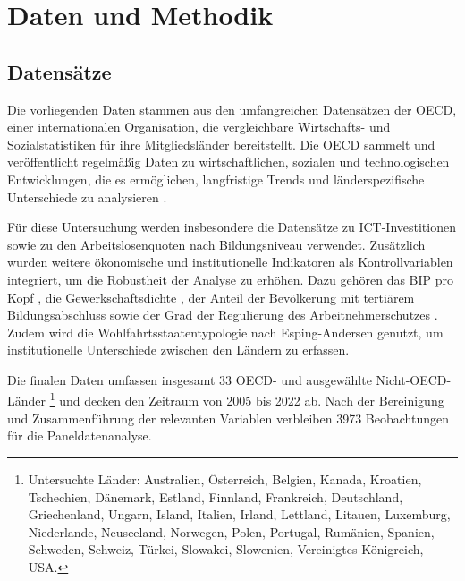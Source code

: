 

\section{Daten und Methodik}

\subsection{Datensätze}

Die vorliegenden Daten stammen aus den umfangreichen Datensätzen der \ac{OECD}, einer 
internationalen Organisation, die vergleichbare Wirtschafts- und Sozialstatistiken für ihre 
Mitgliedsländer bereitstellt. Die \ac{OECD} sammelt und veröffentlicht regelmäßig Daten zu 
wirtschaftlichen, sozialen und technologischen Entwicklungen, die es ermöglichen, langfristige 
Trends und länderspezifische Unterschiede zu analysieren \parencite{oecd2022ict}.

Für diese Untersuchung werden insbesondere die Datensätze zu \ac{ICT}-Investitionen 
\parencite{oecd2022ict} sowie zu den Arbeitslosenquoten nach Bildungsniveau 
\parencite{oecd2022unemployment} verwendet. Zusätzlich wurden weitere ökonomische und 
institutionelle Indikatoren als Kontrollvariablen integriert, um die Robustheit der Analyse 
zu erhöhen. Dazu gehören das \ac{BIP} pro Kopf \parencite{oecd2022gdp}, die Gewerkschaftsdichte 
\parencite{oecd2022tud}, der Anteil der Bevölkerung mit tertiärem Bildungsabschluss 
\parencite{oecd2022education} sowie der Grad der Regulierung des Arbeitnehmerschutzes 
\parencite{oecd2022regulation}. Zudem wird die Wohlfahrtsstaatentypologie nach Esping-Andersen 
\parencite{espingandersen1990thethree} genutzt, um institutionelle Unterschiede zwischen den 
Ländern zu erfassen.

Die finalen Daten umfassen insgesamt 33 OECD- und ausgewählte Nicht-OECD-Länder
\footnote{Untersuchte Länder: Australien, 
Österreich, Belgien, Kanada, Kroatien, Tschechien, Dänemark, Estland, 
Finnland, Frankreich, Deutschland, Griechenland, Ungarn, Island, Italien, Irland, Lettland, 
Litauen, Luxemburg, Niederlande, Neuseeland, Norwegen, Polen, Portugal, Rumänien, Spanien, 
Schweden, Schweiz, Türkei, Slowakei, Slowenien, Vereinigtes Königreich, USA.} und decken den 
Zeitraum von 2005 bis 2022 ab. Nach der Bereinigung und Zusammenführung der relevanten Variablen 
verbleiben 3973 Beobachtungen für die Paneldatenanalyse.

